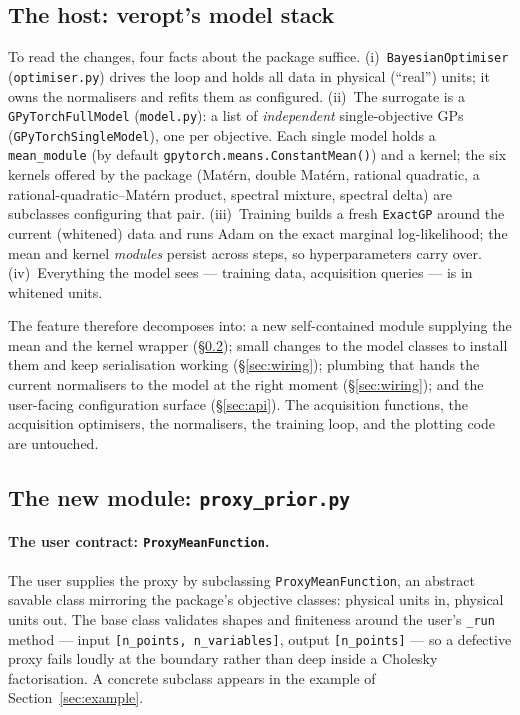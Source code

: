 \documentclass[11pt,a4paper]{article}
\newcommand{\veropt}{\textsf{veropt}}
\newcommand{\code}[1]{\texttt{#1}}
\begin{document}
\subsection{The host: \veropt{}'s model stack}

To read the changes, four facts about the package suffice.
(i)~\code{BayesianOptimiser} (\code{optimiser.py}) drives the loop and holds
all data in physical (``real'') units; it owns the normalisers and refits
them as configured. (ii)~The surrogate is a \code{GPyTorchFullModel}
(\code{model.py}): a list of \emph{independent} single-objective GPs
(\code{GPyTorchSingleModel}), one per objective. Each single model holds a
\code{mean\_module} (by default \code{gpytorch.means.\allowbreak{}ConstantMean()}) and a
kernel; the six kernels offered by the package (Mat\'ern, double Mat\'ern,
rational quadratic, a rational-quadratic--Mat\'ern product, spectral mixture,
spectral delta) are subclasses configuring that pair. (iii)~Training builds a
fresh \code{ExactGP} around the current (whitened) data and runs Adam on the
exact marginal log-likelihood; the mean and kernel \emph{modules} persist
across steps, so hyperparameters carry over. (iv)~Everything the model sees
--- training data, acquisition queries --- is in whitened units.

The feature therefore decomposes into: a new self-contained module
supplying the mean and the kernel wrapper (\S\ref{sec:newmodule}); small
changes to the model classes to install them and keep serialisation working
(\S\ref{sec:wiring}); plumbing that hands the current normalisers to the
model at the right moment (\S\ref{sec:wiring}); and the user-facing
configuration surface (\S\ref{sec:api}). The acquisition functions, the
acquisition optimisers, the normalisers, the training loop, and the plotting
code are untouched.

\subsection{The new module: \code{proxy\_prior.py}}
\label{sec:newmodule}

\paragraph{The user contract: \code{ProxyMeanFunction}.} The user supplies
the proxy by subclassing \code{ProxyMeanFunction}, an abstract savable class
mirroring the package's objective classes: physical units in, physical units
out. The base class validates shapes and finiteness around the user's
\code{\_run} method --- input \code{[n\_points, n\_variables]}, output
\code{[n\_points]} --- so a defective proxy fails loudly at the boundary
rather than deep inside a Cholesky factorisation. A concrete subclass appears
in the example of Section~\ref{sec:example}.
\end{document}
